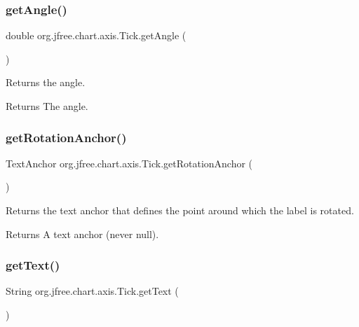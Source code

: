 \subsubsection{\texorpdfstring{get\+Angle()}{getAngle()}}
{\footnotesize\ttfamily double org.\+jfree.\+chart.\+axis.\+Tick.\+get\+Angle (\begin{DoxyParamCaption}{ }\end{DoxyParamCaption})}

Returns the angle.

\begin{DoxyReturn}{Returns}
The angle. 
\end{DoxyReturn}
\mbox{\label{classorg_1_1jfree_1_1chart_1_1axis_1_1_tick_a8e5184bcfb4de2942eafa801c1b385ef}} 
\subsubsection{\texorpdfstring{get\+Rotation\+Anchor()}{getRotationAnchor()}}
{\footnotesize\ttfamily Text\+Anchor org.\+jfree.\+chart.\+axis.\+Tick.\+get\+Rotation\+Anchor (\begin{DoxyParamCaption}{ }\end{DoxyParamCaption})}

Returns the text anchor that defines the point around which the label is rotated.

\begin{DoxyReturn}{Returns}
A text anchor (never {\ttfamily null}). 
\end{DoxyReturn}
\mbox{\label{classorg_1_1jfree_1_1chart_1_1axis_1_1_tick_a6c9cf3d1de674f831874b762d53e6d79}} 
\subsubsection{\texorpdfstring{get\+Text()}{getText()}}
{\footnotesize\ttfamily String org.\+jfree.\+chart.\+axis.\+Tick.\+get\+Text (\begin{DoxyParamCaption}{ }\end{DoxyParamCaption})}

